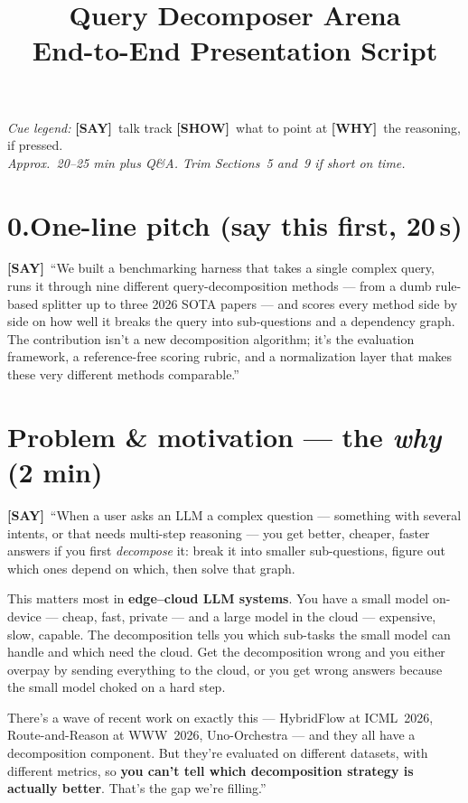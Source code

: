 \documentclass[11pt]{article}
\title{\textbf{Query Decomposer Arena}\\[2pt]
\large End-to-End Presentation Script}
\author{}
\date{}
\newcommand{\say}{\textcolor{sayc}{\textbf{[SAY]}}\ }
\newcommand{\showcue}{\textcolor{showc}{\textbf{[SHOW]}}\ }
\newcommand{\why}{\textcolor{whyc}{\textbf{[WHY]}}\ }
\begin{document}
\maketitle
\vspace{-2.5em}

\noindent\textit{Cue legend:}\quad
\say talk track \quad
\showcue what to point at \quad
\why the reasoning, if pressed.\\
\textit{Approx.\ 20--25 min plus Q\&A. Trim Sections~5 and~9 if short on time.}

\hrulefill

\section*{0.\quad One-line pitch (say this first, 20\,s)}

\say ``We built a benchmarking harness that takes a single complex query, runs it
through nine different query-decomposition methods --- from a dumb rule-based
splitter up to three 2026 SOTA papers --- and scores every method side by side on
how well it breaks the query into sub-questions and a dependency graph. The
contribution isn't a new decomposition algorithm; it's the evaluation framework,
a reference-free scoring rubric, and a normalization layer that makes these very
different methods comparable.''

\section{Problem \& motivation --- the \emph{why} (2 min)}

\say ``When a user asks an LLM a complex question --- something with several
intents, or that needs multi-step reasoning --- you get better, cheaper, faster
answers if you first \emph{decompose} it: break it into smaller sub-questions,
figure out which ones depend on which, then solve that graph.

This matters most in \textbf{edge--cloud LLM systems}. You have a small model
on-device --- cheap, fast, private --- and a large model in the cloud ---
expensive, slow, capable. The decomposition tells you which sub-tasks the small
model can handle and which need the cloud. Get the decomposition wrong and you
either overpay by sending everything to the cloud, or you get wrong answers
because the small model choked on a hard step.

There's a wave of recent work on exactly this --- HybridFlow at ICML~2026,
Route-and-Reason at WWW~2026, Uno-Orchestra --- and they all have a decomposition
component. But they're evaluated on different datasets, with different metrics, so
\textbf{you can't tell which decomposition strategy is actually better}. That's
the gap we're filling.''
\end{document}
